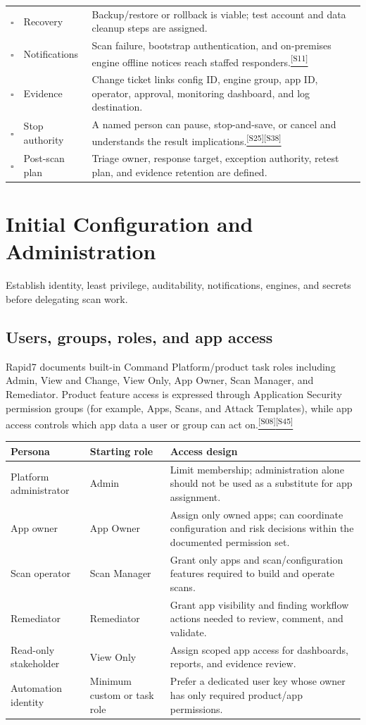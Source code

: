 \documentclass[11pt,letterpaper,oneside]{scrreprt}
\newcommand{\src}[1]{\hyperref[src:#1]{\textsuperscript{\color{R7Orange}[#1]}}}
\newcommand{\chapterlead}[1]{\begin{tcolorbox}[enhanced,colback=R7Light,colframe=R7Light,boxrule=0pt,borderline west={3pt}{0pt}{R7Orange},arc=0pt,left=9pt,right=9pt,top=7pt,bottom=7pt]#1\end{tcolorbox}}
\begin{document}
\begin{longtable}{@{}P{0.28in}P{2.25in}P{3.95in}@{}}
$\square$ & Recovery & Backup/restore or rollback is viable; test account and data cleanup steps are assigned.\\
$\square$ & Notifications & Scan failure, bootstrap authentication, and on-premises engine offline notices reach staffed responders.\src{S11}\\
$\square$ & Evidence & Change ticket links config ID, engine group, app ID, operator, approval, monitoring dashboard, and log destination.\\
$\square$ & Stop authority & A named person can pause, stop-and-save, or cancel and understands the result implications.\src{S25}\src{S38}\\
$\square$ & Post-scan plan & Triage owner, response target, exception authority, retest plan, and evidence retention are defined.\\
\bottomrule
\end{longtable}

\chapter{Initial Configuration and Administration}
\chapterlead{Establish identity, least privilege, auditability, notifications, engines, and secrets before delegating scan work.}

\section{Users, groups, roles, and app access}
Rapid7 documents built-in Command Platform/product task roles including Admin, View and Change, View Only, App Owner, Scan Manager, and Remediator. Product feature access is expressed through Application Security permission groups (for example, Apps, Scans, and Attack Templates), while app access controls which app data a user or group can act on.\src{S08}\src{S45}

\begin{tabularx}{\textwidth}{@{}P{1.25in}P{2.15in}Y@{}}
\toprule
\textbf{Persona} & \textbf{Starting role} & \textbf{Access design}\\
\midrule
Platform administrator & Admin & Limit membership; administration alone should not be used as a substitute for app assignment.\\
App owner & App Owner & Assign only owned apps; can coordinate configuration and risk decisions within the documented permission set.\\
Scan operator & Scan Manager & Grant only apps and scan/configuration features required to build and operate scans.\\
Remediator & Remediator & Grant app visibility and finding workflow actions needed to review, comment, and validate.\\
Read-only stakeholder & View Only & Assign scoped app access for dashboards, reports, and evidence review.\\
Automation identity & Minimum custom or task role & Prefer a dedicated user key whose owner has only required product/app permissions.\\
\bottomrule
\end{tabularx}
\end{document}
